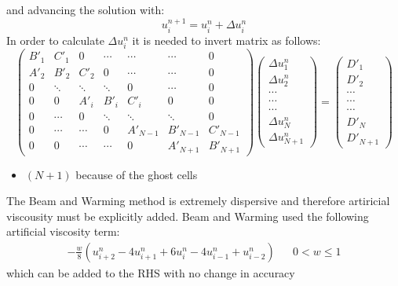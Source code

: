 \documentclass[11pt, a4paper]{article}
\begin{document}
and advancing the solution with:
\begin{equation}
    u_i^{n+1}=u_i^n+\Delta u_i^n
\end{equation}
In order to calculate $\Delta u^n_i$ it is needed to invert matrix as follows:
\begin{equation}
    \begin{pmatrix}
        B'_1 & C'_1 & 0 & \cdots & \cdots & \cdots & 0 \\
        A'_2 & B'_2 & C'_2 & 0 & \cdots & \cdots & 0 \\
        0 & \ddots & \ddots & \ddots & 0 & \cdots & 0 \\
        0 & 0 & A'_i & B'_i & C'_i & 0 & 0 \\
        0 & \cdots & 0 & \ddots & \ddots & \ddots & 0 \\
        0 & \cdots & \cdots & 0 & A'_{N-1} & B'_{N-1} & C'_{N-1} \\
        0 & 0 & \cdots & \cdots & 0 & A'_{N+1} &B'_{N+1}
    \end{pmatrix}
    \begin{pmatrix}
        \Delta u_1^n\\
        \Delta u_2^n\\
        \cdots\\
        \cdots\\
        \cdots\\
        \Delta u_{N}^n\\
        \Delta u_{N+1}^n
    \end{pmatrix}
    =
    \begin{pmatrix}
        D'_1\\
        D'_2\\
        \cdots\\
        \cdots\\
        \cdots\\
        D'_{N}\\
        D'_{N+1}
    \end{pmatrix}
\end{equation}
\begin{itemize}
    \item $\left(N+1\right)$ because of the ghost cells
\end{itemize}
The Beam and Warming method is extremely dispersive and therefore artiricial viscousity must be explicitly added. Beam and Warming used the following artificial viscosity term:
\begin{equation}
    \begin{matrix}
        \displaystyle-\frac{w}{8}\left(u^n_{i+2}-4u^n_{i+1}+6u^n_i-4u^n_{i-1}+u^n_{i-2}\right) && 0<w\le1
    \end{matrix}
\end{equation}
which can be added to the RHS with no change in accuracy
\end{document}
